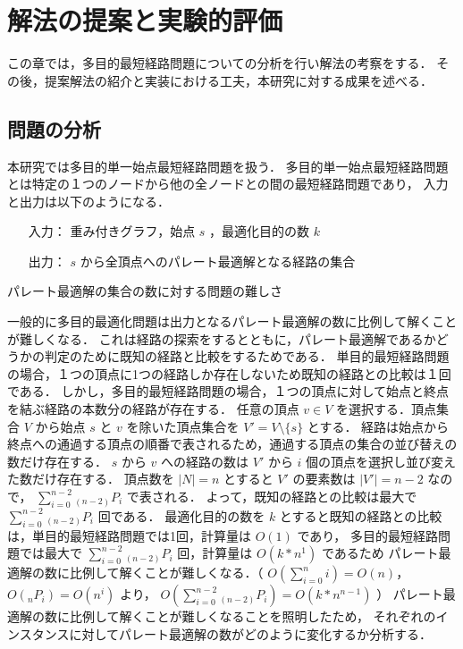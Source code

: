 \documentclass[12pt]{optlab-bachelor}
\begin{document}
\chapter{解法の提案と実験的評価}
この章では，多目的最短経路問題についての分析を行い解法の考察をする．
その後，提案解法の紹介と実装における工夫，本研究に対する成果を述べる．

\section{問題の分析}
本研究では多目的単一始点最短経路問題を扱う．
多目的単一始点最短経路問題とは特定の１つのノードから他の全ノードとの間の最短経路問題であり，
入力と出力は以下のようになる．
\begin{itemize}
  \item[入力：]重み付きグラフ，始点 $s$ ，最適化目的の数 $k$
  \item[出力：]$s$ から全頂点へのパレート最適解となる経路の集合
\end{itemize}

\begin{description}
  \item[パレート最適解の集合の数に対する問題の難しさ]
\end{description}

一般的に多目的最適化問題は出力となるパレート最適解の数に比例して解くことが難しくなる．
これは経路の探索をするとともに，パレート最適解であるかどうかの判定のために既知の経路と比較をするためである．
単目的最短経路問題の場合，１つの頂点に1つの経路しか存在しないため既知の経路との比較は１回である．
しかし，多目的最短経路問題の場合，１つの頂点に対して始点と終点を結ぶ経路の本数分の経路が存在する．
任意の頂点 $v \in V$ を選択する．頂点集合 $V$ から始点 $s$ と $v$ を除いた頂点集合を $V'=V \setminus \{s\}$ とする．
経路は始点から終点への通過する頂点の順番で表されるため，通過する頂点の集合の並び替えの数だけ存在する．
$s$ から $v$ への経路の数は $V'$ から $i$ 個の頂点を選択し並び変えた数だけ存在する．
頂点数を $|N|=n$ とすると $V'$ の要素数は $|V'|=n-2$ なので，
$\displaystyle \sum_{i=0}^{n-2} {}_{(n-2)}P_i$ で表される．
よって，既知の経路との比較は最大で $\displaystyle \sum_{i=0}^{n-2} {}_{(n-2)}P_i$ 回である．
最適化目的の数を $k$ とすると既知の経路との比較は，単目的最短経路問題では1回，計算量は $O(1)$ であり，
多目的最短経路問題では最大で $\displaystyle \sum_{i=0}^{n-2} {}_{(n-2)}P_i$ 回，計算量は $O(k*n^1)$ であるため
パレート最適解の数に比例して解くことが難しくなる．（ $O(\displaystyle \sum_{i=0}^{n} i)=O(n)$，$O({}_nP_i)=O(n^i)$ より，
$O(\displaystyle \sum_{i=0}^{n-2} {}_{(n-2)}P_i)=O(k*n^{n-1})$ ）
パレート最適解の数に比例して解くことが難しくなることを照明したため，
それぞれのインスタンスに対してパレート最適解の数がどのように変化するか分析する．
\end{document}

